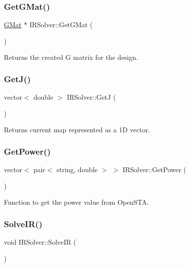 \subsubsection{\texorpdfstring{Get\+G\+Mat()}{GetGMat()}}
{\footnotesize\ttfamily \hyperlink{classGMat}{G\+Mat} $\ast$ I\+R\+Solver\+::\+Get\+G\+Mat (\begin{DoxyParamCaption}{ }\end{DoxyParamCaption})}



Returns the created G matrix for the design. 

\mbox{\label{classIRSolver_a15a1b2f7bbbd71cd568e532bf03ce1b0}} 
\subsubsection{\texorpdfstring{Get\+J()}{GetJ()}}
{\footnotesize\ttfamily vector$<$ double $>$ I\+R\+Solver\+::\+GetJ (\begin{DoxyParamCaption}{ }\end{DoxyParamCaption})}



Returns current map represented as a 1D vector. 

\mbox{\label{classIRSolver_addd237968206ba6e1c875180eddd562f}} 
\subsubsection{\texorpdfstring{Get\+Power()}{GetPower()}}
{\footnotesize\ttfamily vector$<$ pair$<$ string, double $>$ $>$ I\+R\+Solver\+::\+Get\+Power (\begin{DoxyParamCaption}{ }\end{DoxyParamCaption})}



Function to get the power value from Open\+S\+TA. 

\mbox{\label{classIRSolver_ad0c6ef5800e5892f441e11b57d19dcaf}} 
\subsubsection{\texorpdfstring{Solve\+I\+R()}{SolveIR()}}
{\footnotesize\ttfamily void I\+R\+Solver\+::\+Solve\+IR (\begin{DoxyParamCaption}{ }\end{DoxyParamCaption})}




